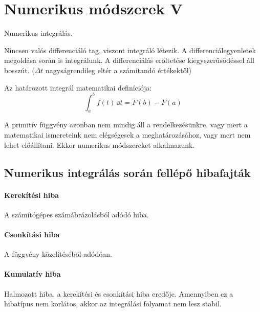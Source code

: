 \documentclass[../../main.tex]{subfiles}
\begin{document}
\section{Numerikus módszerek V}

\begin{fulltheorem}
  Numerikus integrálás.
\end{fulltheorem}

Nincsen valós differenciáló tag, viszont integráló létezik.
A differenciálegyenletek megoldása során is integrálunk.
A differenciálás erőltetése kiegyszerűsödéssel áll bosszút.
($\Delta t$ nagyságrendileg eltér a számítandó értékektől)

Az határozott integrál matematikai definíciója:
\[
  \int_a^b f(t) \, \dd t = F(b) - F(a)
\]

A primitív függvény azonban nem mindig áll a rendelkezésünkre, vagy mert a
matematikai ismereteink nem elégségesek a meghatározásához, vagy mert nem lehet
előállítani. Ekkor numerikus módszereket alkalmazunk.

\subsection{Numerikus integrálás során fellépő hibafajták}

\paragraph{Kerekítési hiba}

A számítógépes számábrázolásból adódó hiba.

\paragraph{Csonkítási hiba}

A függvény közelítéséből adódóan.

\paragraph{Kumulatív hiba}

Halmozott hiba, a kerekítési és csonkítási hiba eredője.
Amennyiben ez a hibatípus nem korlátos, akkor az integrálási folyamat
nem lesz stabil.
\end{document}
